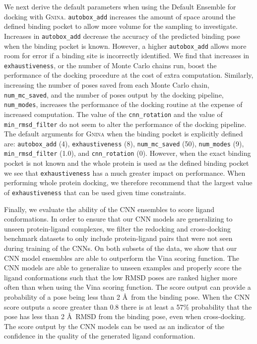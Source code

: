 \documentclass[journal=jcisd8,manuscript=article]{achemso}
\begin{document}
We next derive the default parameters when using the Default Ensemble for docking with \textsc{Gnina}. \texttt{autobox\_add} increases the amount of space around the defined binding pocket to allow more volume for the sampling to investigate. Increases in \texttt{autobox\_add} decrease the accuracy of the predicted binding pose when the binding pocket is known. However, a higher \texttt{autobox\_add} allows more room for error if a binding site is incorrectly identified. We find that increases in \texttt{exhaustiveness}, or the number of Monte Carlo chains run, boost the performance of the docking procedure at the cost of extra computation. Similarly, increasing the number of poses saved from each Monte Carlo chain, \texttt{num\_mc\_saved}, and the number of poses output by the docking pipeline, \texttt{num\_modes}, increases the performance of the docking routine at the expense of increased computation. The value of the \texttt{cnn\_rotation} and the value of \texttt{min\_rmsd\_filter} do not seem to alter the performance of the docking pipeline. The default arguments for \textsc{Gnina} when the binding pocket is explicitly defined are: \texttt{autobox\_add} (4), \texttt{exhaustiveness} (8), \texttt{num\_mc\_saved} (50), \texttt{num\_modes} (9), \texttt{min\_rmsd\_filter} (1.0), and \texttt{cnn\_rotation} (0). However, when the exact binding pocket is not known and the whole protein is used as the defined binding pocket we see that \texttt{exhaustiveness} has a much greater impact on performance. When performing whole protein docking, we therefore recommend that the largest value of \texttt{exhaustiveness} that can be used given time constraints.

Finally, we evaluate the ability of the CNN ensembles to score ligand conformations. In order to ensure that our CNN models are generalizing to unseen protein-ligand complexes, we filter the redocking and cross-docking benchmark datasets to only include protein-ligand pairs that were not seen during training of the CNNs. On both subsets of the data, we show that our CNN model ensembles are able to outperform the Vina scoring function. The CNN models are able to generalize to unseen examples and properly score the ligand conformations such that the low RMSD poses are ranked higher more often than when using the Vina scoring function. The score output can provide a probability of a pose being less than 2 \AA~from the binding pose. When the CNN score outputs a score greater than 0.8 there is at least a 57\% probability that the pose has less than 2 \AA~RMSD from the binding pose, even when cross-docking. The score output by the CNN models can be used as an indicator of the confidence in the quality of the generated ligand conformation.
\end{document}
